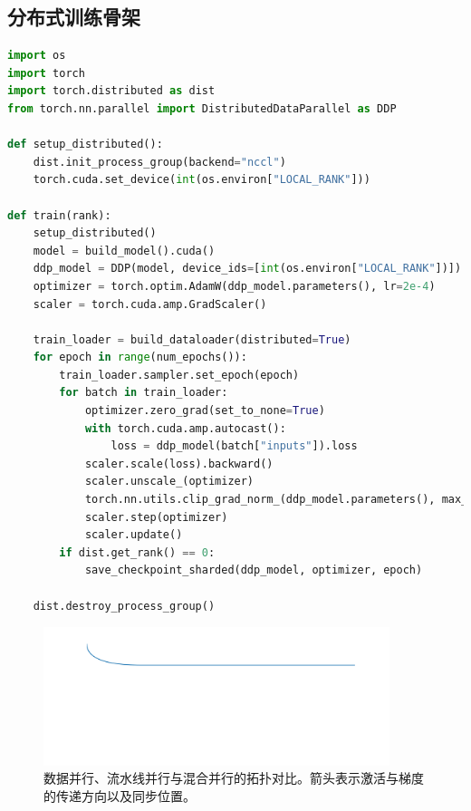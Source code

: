 \documentclass[UTF8,zihao=-4]{ctexart}
\begin{document}
\subsection{分布式训练骨架}

\begin{lstlisting}[language=Python, caption={PyTorch 分布式数据并行骨架，带弹性重启钩子。}]
import os
import torch
import torch.distributed as dist
from torch.nn.parallel import DistributedDataParallel as DDP

def setup_distributed():
    dist.init_process_group(backend="nccl")
    torch.cuda.set_device(int(os.environ["LOCAL_RANK"]))

def train(rank):
    setup_distributed()
    model = build_model().cuda()
    ddp_model = DDP(model, device_ids=[int(os.environ["LOCAL_RANK"])])
    optimizer = torch.optim.AdamW(ddp_model.parameters(), lr=2e-4)
    scaler = torch.cuda.amp.GradScaler()

    train_loader = build_dataloader(distributed=True)
    for epoch in range(num_epochs()):
        train_loader.sampler.set_epoch(epoch)
        for batch in train_loader:
            optimizer.zero_grad(set_to_none=True)
            with torch.cuda.amp.autocast():
                loss = ddp_model(batch["inputs"]).loss
            scaler.scale(loss).backward()
            scaler.unscale_(optimizer)
            torch.nn.utils.clip_grad_norm_(ddp_model.parameters(), max_norm=1.0)
            scaler.step(optimizer)
            scaler.update()
        if dist.get_rank() == 0:
            save_checkpoint_sharded(ddp_model, optimizer, epoch)

    dist.destroy_process_group()
\end{lstlisting}

\begin{figure}[H]
  \centering
  \includegraphics[width=0.9\textwidth]{distributed_training_topologies.png}
  \caption{数据并行、流水线并行与混合并行的拓扑对比。箭头表示激活与梯度的传递方向以及同步位置。}
  \label{fig:distributed_training_topologies_cn}
\end{figure}
\end{document}
